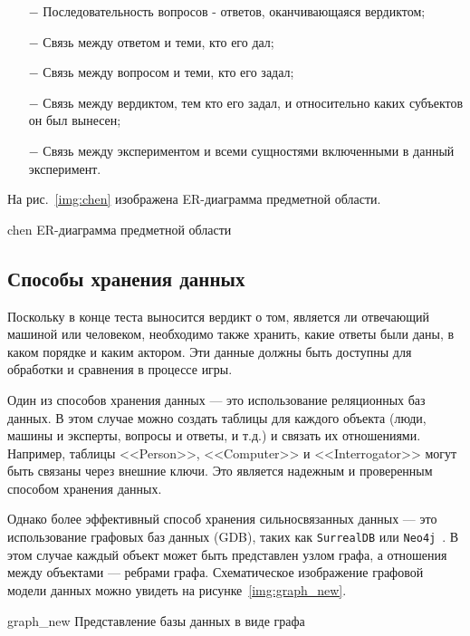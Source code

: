 \begin{enumerate}
    \begin{itemize}
      \item[$-$] Последовательность вопросов - ответов, оканчивающаяся вердиктом;
      \item[$-$] Связь между ответом и теми, кто его дал;
      \item[$-$] Связь между вопросом и теми, кто его задал;
      \item[$-$] Связь между вердиктом, тем кто его задал, и относительно каких субъектов он был вынесен;
      \item[$-$] Связь между экспериментом и всеми сущностями включенными в данный эксперимент.
    \end{itemize}
\end{enumerate}

На рис.~\ref{img:chen} изображена ER-диаграмма предметной области.

\img{200mm}
{chen}
{ER-диаграмма предметной области}

\clearpage

\subsection{Способы хранения данных}

Поскольку в конце теста выносится вердикт о том, является ли отвечающий машиной или человеком, необходимо также хранить, какие ответы были даны, в каком порядке и каким актором. 
Эти данные должны быть доступны для обработки и сравнения в процессе игры.
 
Один из способов хранения данных --- это использование реляционных баз данных. В этом случае можно создать таблицы для каждого объекта (люди, машины и эксперты, вопросы и ответы, и т.д.) и связать их отношениями. 
Например, таблицы <<Person>>, <<Computer>> и <<Interrogator>> могут быть связаны через внешние ключи. 
Это является надежным и проверенным способом хранения данных.

Однако более эффективный способ хранения сильносвязанных данных --- это использование графовых баз данных (GDB), таких как \texttt{SurrealDB} или \texttt{Neo4j}~\cite{DBLP:journals/corr/LinMPS16}. 
В этом случае каждый объект может быть представлен узлом графа, а отношения между объектами --- ребрами графа. Схематическое изображение графовой модели данных можно увидеть на рисунке~\ref{img:graph_new}.

\img{100mm}
{graph_new}
{Представление базы данных в виде графа}

